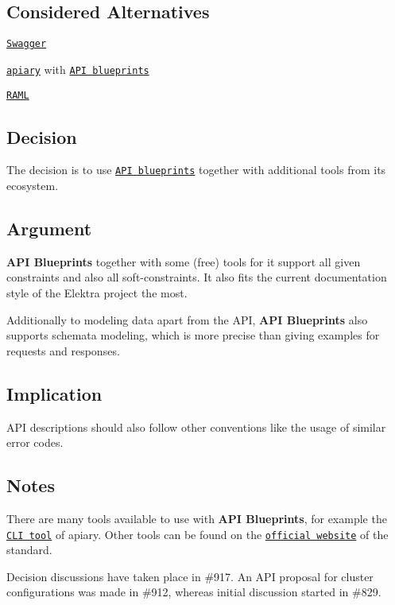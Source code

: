 \subsection*{Considered Alternatives}


\begin{DoxyItemize}
\item \href{http://swagger.io/}{\tt Swagger}
\item \href{https://apiary.io/}{\tt apiary} with \href{https://apiblueprint.org/}{\tt A\+PI blueprints}
\item \href{http://raml.org/}{\tt R\+A\+ML}
\end{DoxyItemize}

\subsection*{Decision}

The decision is to use \href{https://apiblueprint.org/}{\tt A\+PI blueprints} together with additional tools from its ecosystem.

\subsection*{Argument}

{\bfseries A\+PI Blueprints} together with some (free) tools for it support all given constraints and also all soft-\/constraints. It also fits the current documentation style of the Elektra project the most.

Additionally to modeling data apart from the A\+PI, {\bfseries A\+PI Blueprints} also supports schemata modeling, which is more precise than giving examples for requests and responses.

\subsection*{Implication}


\begin{DoxyItemize}
\item A\+PI descriptions should also follow other conventions like the usage of similar error codes.
\end{DoxyItemize}

\subsection*{Notes}

There are many tools available to use with {\bfseries A\+PI Blueprints}, for example the \href{https://github.com/apiaryio/apiary-client}{\tt C\+LI tool} of apiary. Other tools can be found on the \href{https://apiblueprint.org/tools.html}{\tt official website} of the standard.

Decision discussions have taken place in \#917. An A\+PI proposal for cluster configurations was made in \#912, whereas initial discussion started in \#829. 